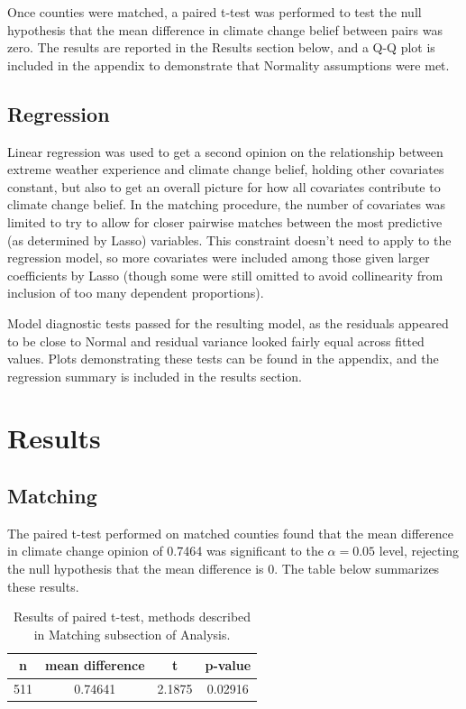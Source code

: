\documentclass{article}
\begin{document}
Once counties were matched, a paired t-test was performed to test the null hypothesis that the mean difference in climate change belief between pairs was zero. The results are reported in the Results section below, and a Q-Q plot is included in the appendix to demonstrate that Normality assumptions were met. 

\subsection{Regression}
Linear regression was used to get a second opinion on the relationship between extreme weather experience and climate change belief, holding other covariates constant, but also to get an overall picture for how all covariates contribute to climate change belief. In the matching procedure, the number of covariates was limited to try to allow for closer pairwise matches between the most predictive (as determined by Lasso) variables. This constraint doesn't need to apply to the regression model, so more covariates were included among those given larger coefficients by Lasso (though some were still omitted to avoid collinearity from inclusion of too many dependent proportions). 

Model diagnostic tests passed for the resulting model, as the residuals appeared to be close to Normal and residual variance looked fairly equal across fitted values. Plots demonstrating these tests can be found in the appendix, and the regression summary is included in the results section. 

\section{Results}
\subsection{Matching}
The paired t-test performed on matched counties found that the mean difference in climate change opinion of 0.7464 was significant to the $\alpha = 0.05$ level, rejecting the null hypothesis that the mean difference is 0. The table below summarizes these results.

\begin{table}[H]
\centering
\begin{tabular}{|| c | c | c | c ||}
\hline
n & mean difference & t & p-value \\ [0.5ex]
\hline
\hline
511 & 0.74641 & 2.1875 & 0.02916 \\
\hline
\end{tabular}
\caption{Results of paired t-test, methods described in Matching subsection of Analysis.}
\end{table}
\end{document}
